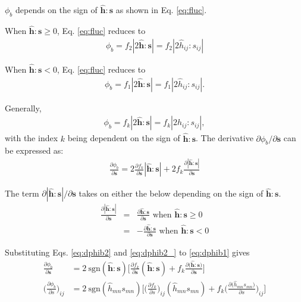 \documentclass[12pt]{amsart}
\begin{document}
$\phi_b$ depends on the sign of $\hat{\mathbf{h}}:\mathbf{s}$ as shown in Eq. \ref{eq:fluc}.

When $\hat{\mathbf{h}}:\mathbf{s}\ge0$, Eq. \ref{eq:fluc} reduces to
\begin{eqnarray}
    \label{eq:fluc1}
\phi_b =f_2|2\hat{\mathbf{h}}:\mathbf{s}|=f_2|2\hat{h}_{ij}:s_{ij}|
\end{eqnarray}


When $\hat{\mathbf{h}}:\mathbf{s}<0$, Eq. \ref{eq:fluc} reduces to
\begin{eqnarray}
    \label{eq:fluc2}
\phi_b  =f_1|2\hat{\mathbf{h}}:\mathbf{s}|=f_1|2\hat{h}_{ij}:s_{ij}|.
\end{eqnarray}

Generally,
\begin{eqnarray}
    \label{eq:fluc3}
\phi_b  =f_k|2\hat{\mathbf{h}}:\mathbf{s}|=f_k|2\hat{h}_{ij}:s_{ij}|,
\end{eqnarray}
with the index $k$ being dependent on the sign of $\hat{\mathbf{h}}:\mathbf{s}$.
The derivative $\partial\phi_b/\partial\mathbf{s}$ can be expressed as:
\begin{eqnarray}
    \label{eq:dphib1}
\frac{\partial{\phi_b}}{\partial{\mathbf{s}}} = 2\frac{\partial{f_k}}{\partial{\mathbf{s}}} |\hat{\mathbf{h}}:\mathbf{s}| + 2 f_k \frac{\partial{|\hat{\mathbf{h}}:\mathbf{s}|}}{\partial{\mathbf{s}}}
\end{eqnarray}

The term $\partial|\hat{\mathbf{h}}:\mathbf{s}|/\partial\mathbf{s}$ takes on either the below depending on the sign of $\hat{\mathbf{h}}:\mathbf{s}$.
\begin{eqnarray}
  \label{eq:dphib2}
  \frac{\partial{|\hat{\mathbf{h}}:\mathbf{s}|}}{\partial{\mathbf{s}}} &=&  \frac{\partial{\hat{\mathbf{h}}:\mathbf{s}}}{\partial{\mathbf{s}}}   \text{  when } \hat{\mathbf{h}}:\mathbf{s}\ge0\\
  \label{eq:dphib2_}
                                                                       &=& -\frac{\partial{\hat{\mathbf{h}}:\mathbf{s}}}{\partial{\mathbf{s}}}   \text{  when } \hat{\mathbf{h}}:\mathbf{s} < 0
\end{eqnarray}

Substituting Eqs. \ref{eq:dphib2} and \ref{eq:dphib2_} to \ref{eq:dphib1} gives
\begin{equation}
  \label{eq:dphib1_}
  \begin{split}
    \frac{\partial\phi_b}{\partial\mathbf{s}}          &= 2\ \text{sgn}(\hat{\mathbf{h}}:\mathbf{s}) \bigg[  \frac{\partial{f_k}}{\partial{\mathbf{s}}} (\hat{\mathbf{h}}:\mathbf{s}) + f_k \frac{\partial\big({\hat{\mathbf{h}}:\mathbf{s}}\big)}{\partial{\mathbf{s}}} \bigg]\\
    \bigg(\frac{\partial\phi_b}{\partial s}\bigg)_{ij} &= 2\ \text{sgn}(\hat{h}_{mn}s_{mn}) \bigg[  \bigg(\frac{\partial f_k}{\partial s}\bigg)_{ij} (\hat{h}_{mn}s_{mn}) + f_k \bigg(\frac{\partial\big({\hat{h}_{mn}s_{mn}}\big)}{\partial s}\bigg)_{ij} \bigg]\\
  \end{split}
\end{equation}
\end{document}
